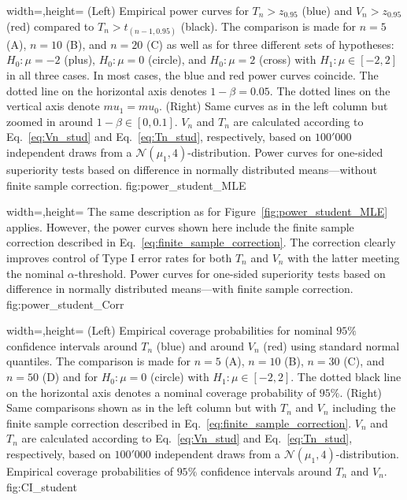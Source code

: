   {width=\textwidth,height=\textheight}%
  {(Left) Empirical power curves for ${T_n > z_{0.95}}$ (blue) and ${V_n > z_{0.95}}$ (red) compared to ${T_n > t_{(n-1,0.95)}}$ (black). The comparison is made for $n=5$ (A), $n=10$ (B), and $n=20$ (C) as well as for three different sets of hypotheses: $H_0: \mu=-2$ (plus), ${H_0: \mu=0}$ (circle), and ${H_0: \mu=2}$ (cross) with ${H_1: \mu \in [-2,2]}$ in all three cases. In most cases, the blue and red power curves coincide. The dotted line on the horizontal axis denotes ${1-\beta = 0.05}$. The dotted lines on the vertical axis denote $mu_1 = mu_0$. (Right) Same curves as in the left column but zoomed in around ${1-\beta \in [0,0.1]}$. $V_n$ and $T_n$ are calculated according to Eq.~\ref{eq:Vn_stud} and Eq.~\ref{eq:Tn_stud}, respectively, based on $100'000$ independent draws from a $\mathcal{N}(\mu_1,4)$-distribution.}%
  {Power curves for one-sided superiority tests based on difference in normally distributed means---without finite sample correction.}%
  {fig:power_student_MLE}%
  
  {width=\textwidth,height=\textheight}%
  {The same description as for Figure~\ref{fig:power_student_MLE} applies. However, the power curves shown here include the finite sample correction described in Eq.~\ref{eq:finite_sample_correction}. The correction clearly improves control of Type I error rates for both $T_n$ and $V_n$ with the latter meeting the nominal $\alpha$-threshold.}%
  {Power curves for one-sided superiority tests based on difference in normally distributed means---with finite sample correction.}%
  {fig:power_student_Corr}%

  {width=\textwidth,height=\textheight}%
  {(Left) Empirical coverage probabilities for nominal $95\%$ confidence intervals around $T_n$ (blue) and around $V_n$ (red) using standard normal quantiles. The comparison is made for $n=5$ (A), $n=10$ (B), $n=30$ (C), and $n=50$ (D) and for ${H_0: \mu=0}$ (circle) with ${H_1: \mu \in [-2,2]}$. The dotted black line on the horizontal axis denotes a nominal coverage probability of $95\%$. (Right) Same comparisons shown as in the left column but with $T_n$ and $V_n$ including the finite sample correction described in Eq.~\ref{eq:finite_sample_correction}. $V_n$ and $T_n$ are calculated according to Eq.~\ref{eq:Vn_stud} and Eq.~\ref{eq:Tn_stud}, respectively, based on $100'000$ independent draws from a $\mathcal{N}(\mu_1,4)$-distribution.}%
  {Empirical coverage probabilities of $95\%$ confidence intervals around $T_n$ and $V_n$.}%
  {fig:CI_student}%